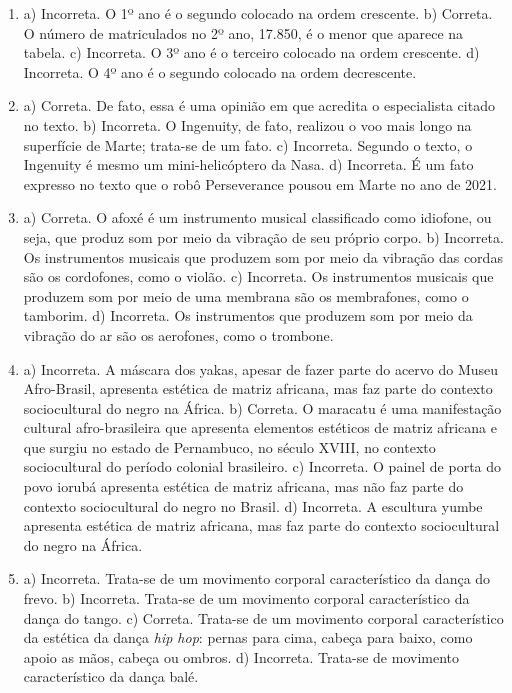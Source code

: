 \begin{enumerate}
\item
a) Incorreta. O 1º ano é o segundo colocado na ordem crescente.
b) Correta. O número de matriculados no 2º ano, 17.850, é o menor que aparece na tabela.
c) Incorreta. O 3º ano é o terceiro colocado na ordem crescente.
d) Incorreta. O 4º ano é o segundo colocado na ordem decrescente.

\item
a) Correta. De fato, essa é uma opinião em que acredita o especialista citado no texto.
b) Incorreta. O Ingenuity, de fato, realizou o voo mais longo na superfície de Marte; trata-se de um fato.
c) Incorreta. Segundo o texto, o Ingenuity é mesmo um mini-helicóptero da Nasa.
d) Incorreta. É um fato expresso no texto que o robô Perseverance pousou em Marte no ano de 2021.

\item
a) Correta. O afoxé é um instrumento musical classificado como idiofone,
ou seja, que produz som por meio da vibração de seu próprio corpo.
b) Incorreta. Os instrumentos musicais que produzem som por meio da
vibração das cordas são os cordofones, como o violão.
c) Incorreta. Os instrumentos musicais que produzem som por meio de uma
membrana são os membrafones, como o tamborim.
d) Incorreta. Os instrumentos que produzem som por meio da vibração do ar
são os aerofones, como o trombone.

\item
a) Incorreta. A máscara dos yakas, apesar de fazer parte do acervo do
Museu Afro-Brasil, apresenta estética de matriz africana, mas faz parte
do contexto sociocultural do negro na África.
b) Correta. O maracatu é uma manifestação cultural afro-brasileira que
apresenta elementos estéticos de matriz africana e que surgiu no estado
de Pernambuco, no século XVIII, no contexto sociocultural do período
colonial brasileiro.
c) Incorreta. O painel de porta do povo iorubá apresenta estética de
matriz africana, mas não faz parte do contexto sociocultural do negro no
Brasil.
d) Incorreta. A escultura yumbe apresenta estética de matriz africana,
mas faz parte do contexto sociocultural do negro na África.

\item
a) Incorreta. Trata-se de um movimento corporal característico da dança do frevo.
b) Incorreta. Trata-se de um movimento corporal característico da dança do tango.
c) Correta. Trata-se de um movimento corporal característico da estética da dança \textit{hip
hop}: pernas para cima, cabeça para baixo, como apoio as mãos, cabeça ou ombros.
d) Incorreta. Trata-se de movimento característico da dança balé.


\end{enumerate}
